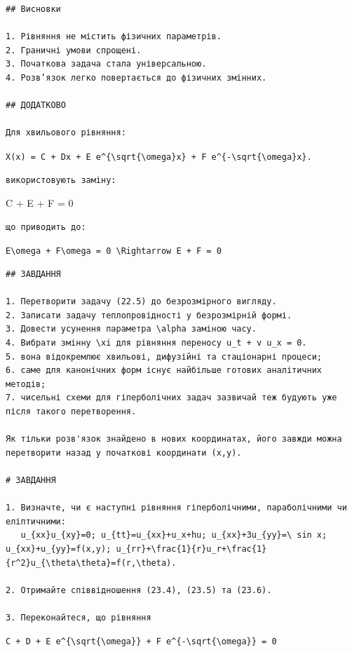 \documentclass[
  ukrainian,
]{article}
\begin{document}
\begin{verbatim}
## Висновки

1. Рівняння не містить фізичних параметрів.
2. Граничні умови спрощені.
3. Початкова задача стала універсальною.
4. Розв’язок легко повертається до фізичних змінних.

## ДОДАТКОВО

Для хвильового рівняння:
\end{verbatim}

\texttt{X(x)\ =\ C\ +\ Dx\ +\ E\ e\^{}\{\textbackslash{}sqrt\{\textbackslash{}omega\}x\}\ +\ F\ e\^{}\{-\textbackslash{}sqrt\{\textbackslash{}omega\}x\}.}

\begin{verbatim}
використовують заміну:
\end{verbatim}

C + E + F = 0

\begin{verbatim}
що приводить до:
\end{verbatim}

\texttt{E\textbackslash{}omega\ +\ F\textbackslash{}omega\ =\ 0\ \textbackslash{}Rightarrow\ E\ +\ F\ =\ 0}

\begin{verbatim}
## ЗАВДАННЯ

1. Перетворити задачу (22.5) до безрозмірного вигляду.
2. Записати задачу теплопровідності у безрозмірній формі.
3. Довести усунення параметра \alpha заміною часу.
4. Вибрати змінну \xi для рівняння переносу u_t + v u_x = 0.
5. вона відокремлює хвильові, дифузійні та стаціонарні процеси;
6. саме для канонічних форм існує найбільше готових аналітичних методів;
7. чисельні схеми для гіперболічних задач зазвичай теж будують уже після такого перетворення.

Як тільки розв'язок знайдено в нових координатах, його завжди можна перетворити назад у початкові координати (x,y).

# ЗАВДАННЯ

1. Визначте, чи є наступні рівняння гіперболічними, параболічними чи еліптичними:
   u_{xx}u_{xy}=0; u_{tt}=u_{xx}+u_x+hu; u_{xx}+3u_{yy}=\ sin x; u_{xx}+u_{yy}=f(x,y); u_{rr}+\frac{1}{r}u_r+\frac{1}{r^2}u_{\theta\theta}=f(r,\theta).

2. Отримайте співвідношення (23.4), (23.5) та (23.6).

3. Переконайтеся, що рівняння
\end{verbatim}

\texttt{C\ +\ D\ +\ E\ e\^{}\{\textbackslash{}sqrt\{\textbackslash{}omega\}\}\ +\ F\ e\^{}\{-\textbackslash{}sqrt\{\textbackslash{}omega\}\}\ =\ 0}
\end{document}
